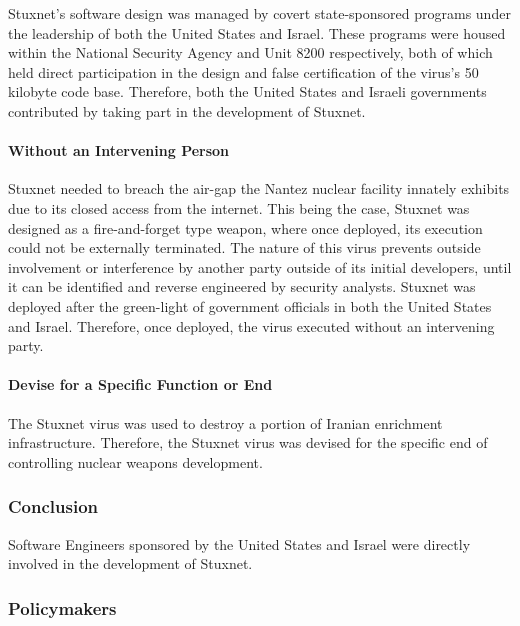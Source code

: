 \documentclass[12pt]{article}
\begin{document}
\begin{multicols}{2}
Stuxnet's software design was managed by covert state-sponsored programs under the leadership of both the United States and Israel. These programs were housed within the National Security Agency and Unit 8200 respectively, both of which held direct participation in the design and false certification of the virus's 50 kilobyte code base.\cite{NationalSecurityAgencyAndUnit8200}\cite{w32.stuxnetDossier} Therefore, both the United States and Israeli governments contributed by taking part in the development of Stuxnet.

\paragraph{Without an Intervening Person}

Stuxnet needed to breach the air-gap the Nantez nuclear facility innately exhibits due to its closed access from the internet. This being the case, Stuxnet was designed as a fire-and-forget type weapon, where once deployed, its execution could not be externally terminated.\cite{stuxnetFireandForget} The nature of this virus prevents outside involvement or interference by another party outside of its initial developers, until it can be identified and reverse engineered by security analysts. Stuxnet was deployed after the green-light of government officials in both the United States and Israel. Therefore, once deployed, the virus executed without an intervening party.

\paragraph{Devise for a Specific Function or End}

The Stuxnet virus was used to destroy a portion of Iranian enrichment infrastructure.\cite{theRealStoryOfStuxnet} Therefore, the Stuxnet virus was devised for the specific end of controlling nuclear weapons development.

\subsubsection{Conclusion}
Software Engineers sponsored by the United States and Israel were directly involved in the development of Stuxnet.

\subsubsection{Policymakers}


\end{multicols}
\end{document}
